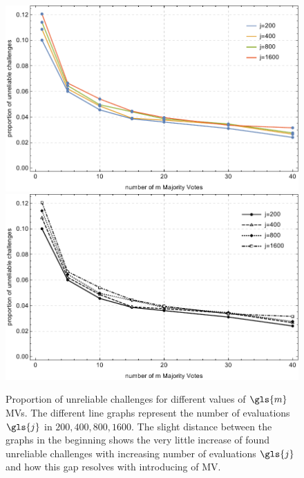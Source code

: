 \vspace{0.25cm}
\begin{figure}[ht]
\ifx{}\undefined
{}
\else
	\if{}
	\centering
	\includegraphics[width=1.00\textwidth]{images/mv-measurements-unstableChallenges.pdf}
	\else
	\includegraphics[width=1.00\textwidth]{images/mv-measurements-unstableChallenges_mono.pdf}
	\fi
\fi
\caption[Proportion of unreliable challenges]{Proportion of unreliable challenges for different values of $\gls{m}$ \acp{MV}. The different line graphs represent the number of evaluations $\gls{j}$ in $200, 400, 800, 1600$. The slight distance between the graphs in the beginning shows the very little increase of found unreliable challenges with increasing number of evaluations $\gls{j}$ and how this gap resolves with introducing of \ac{MV}.}
\label{fig:cmamajorityvotemeasurementrelation}
\end{figure}



